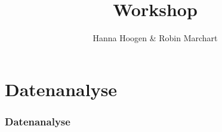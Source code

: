 \documentclass[aspectratio=169]{beamer}
\title{Workshop }
\author{Hanna Hoogen \& Robin Marchart}
\institute{TUM Kolleg Wissenschaftstag}
\begin{document}
 
    \begin{frame}
        
    \end{frame}
    \maketitle
    \section{Datenanalyse}
    \begin{frame}
        \frametitle{Datenanalyse}
        \transfade%
        
    
    \end{frame}
\end{document}
